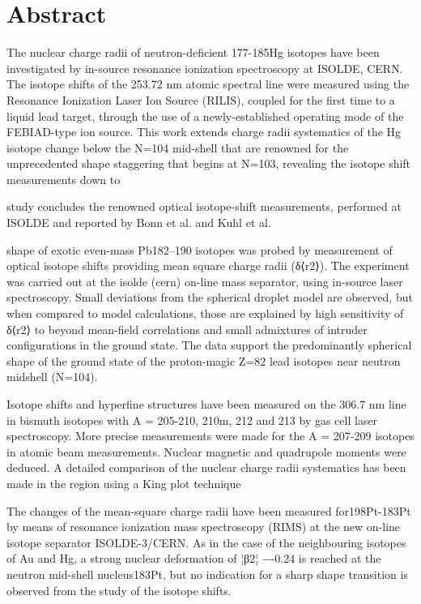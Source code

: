 \section{Abstract}
The nuclear charge radii of neutron-deficient 177-185Hg isotopes have been investigated by in-source resonance ionization spectroscopy at ISOLDE, CERN.  The isotope shifts of the 253.72 nm atomic spectral line were measured using the Resonance Ionization Laser Ion Source (RILIS), coupled for the first time to a liquid lead target, through the use of a newly-established operating mode of the FEBIAD-type ion source. This work extends charge radii systematics of the Hg isotope change below the N=104 mid-shell that are renowned for the unprecedented shape staggering that begins at N=103, revealing   the isotope shift measurements down to 

study concludes the renowned optical isotope-shift measurements, performed at ISOLDE and reported by Bonn et al. and Kuhl et al.

shape of exotic even-mass Pb182–190 isotopes was probed by measurement of optical isotope shifts providing mean square charge radii (δ⟨r2⟩). The experiment was carried out at the isolde (cern) on-line mass separator, using in-source laser spectroscopy. Small deviations from the spherical droplet model are observed, but when compared to model calculations, those are explained by high sensitivity of δ⟨r2⟩ to beyond mean-field correlations and small admixtures of intruder configurations in the ground state. The data support the predominantly spherical shape of the ground state of the proton-magic Z=82 lead isotopes near neutron midshell (N=104).


Isotope shifts and hyperfine structures have been measured on the 306.7 nm line in bismuth isotopes with A = 205-210, 210m, 212 and 213 by gas cell laser spectroscopy. More precise measurements were made for the A = 207-209 isotopes in atomic beam measurements. Nuclear magnetic and quadrupole moments were deduced. A detailed comparison of the nuclear charge radii systematics has been made in the region using a King plot technique

The changes of the mean-square charge radii have been measured for198Pt-183Pt by means of resonance ionization mass spectroscopy (RIMS) at the new on-line isotope separator ISOLDE-3/CERN. As in the case of the neighbouring isotopes of Au and Hg, a strong nuclear deformation of ¦β2¦ −-0.24 is reached at the neutron mid-shell nucleus183Pt, but no indication for a sharp shape transition is observed from the study of the isotope shifts.